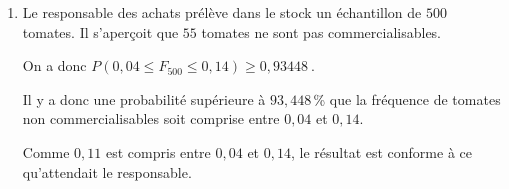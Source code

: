 \documentclass[10pt]{article}
\providecommand{\np}[2][]{{#2~#1}}
\begin{document}
\begin{enumerate}
\begin{enumerate}
$P\left (0,04 < F_n < 0,14\right ) =  1-P \left (\left | F_n-0,09 \right | \geqslant 0,05\right )$	

$P\left ( \left |F_n-0,09\strut \right | \geqslant 0,05 \right ) \leqslant \dfrac{32,76}{n}$
donc
$-P\left ( \left |F_n-0,09\strut \right | \geqslant 0,05 \right ) \geqslant -\dfrac{32,76}{n}$

donc
$1-P\left ( \left |F_n-0,09\strut \right | \geqslant 0,05 \right ) \geqslant 1 -\dfrac{32,76}{n}$
et donc
$P\left (0,04 < F_n < 0,14\right ) \geqslant 1 -\dfrac{32,76}{n}$

		\item Le responsable des achats prélève dans le stock un échantillon de $500$ tomates. Il s'aperçoit que $55$ tomates ne sont pas commercialisables.




On a donc $P\left (0,04 \leqslant F_{500} \leqslant 0,14\right ) \geqslant \np{0,93448}$.

Il y a donc une probabilité supérieure à $93,448$\,\% que la fréquence de tomates non commercialisables soit comprise entre $0,04$ et $0,14$.

Comme $0,11$ est compris  entre $0,04$ et $0,14$, le résultat est conforme à ce qu'attendait le responsable.

	\end{enumerate}
\end{enumerate}

\medskip
\end{document}
